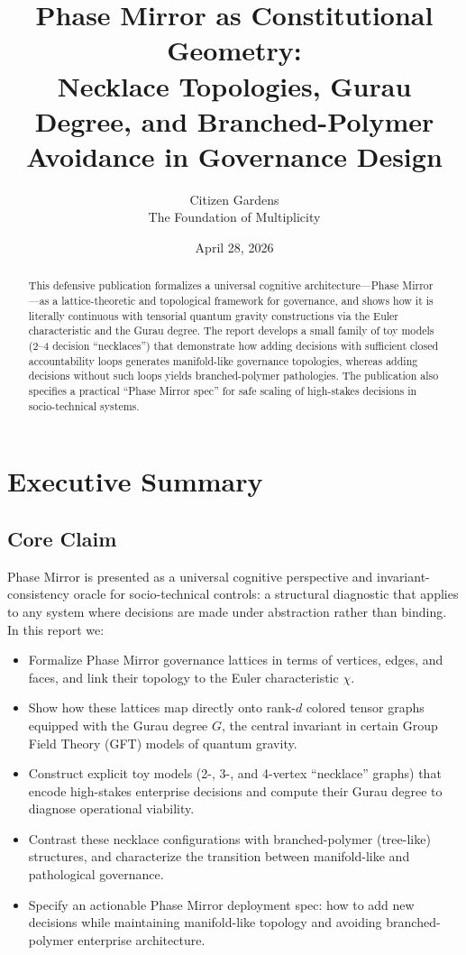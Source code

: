 \documentclass[11pt]{article}
\title{Phase Mirror as Constitutional Geometry:\\
Necklace Topologies, Gurau Degree, and Branched-Polymer Avoidance in Governance Design}
\author{Citizen Gardens \\ The Foundation of Multiplicity}
\date{April 28, 2026}
\begin{document}
\maketitle

\begin{abstract}
This defensive publication formalizes a universal cognitive architecture---Phase Mirror---as a lattice-theoretic and topological framework for governance, and shows how it is literally continuous with tensorial quantum gravity constructions via the Euler characteristic and the Gurau degree. The report develops a small family of toy models (2--4 decision ``necklaces'') that demonstrate how adding decisions with sufficient closed accountability loops generates manifold-like governance topologies, whereas adding decisions without such loops yields branched-polymer pathologies. The publication also specifies a practical ``Phase Mirror spec'' for safe scaling of high-stakes decisions in socio-technical systems.
\end{abstract}
\newpage
\tableofcontents

\section{Executive Summary}

\subsection{Core Claim}

Phase Mirror is presented as a universal cognitive perspective and invariant-consistency oracle for socio-technical controls: a structural diagnostic that applies to any system where decisions are made under abstraction rather than binding. In this report we:

\begin{itemize}
  \item Formalize Phase Mirror governance lattices in terms of vertices, edges, and faces, and link their topology to the Euler characteristic \(\chi\).
  \item Show how these lattices map directly onto rank-\(d\) colored tensor graphs equipped with the Gurau degree \(G\), the central invariant in certain Group Field Theory (GFT) models of quantum gravity.
  \item Construct explicit toy models (2-, 3-, and 4-vertex ``necklace'' graphs) that encode high-stakes enterprise decisions and compute their Gurau degree to diagnose operational viability.
  \item Contrast these necklace configurations with branched-polymer (tree-like) structures, and characterize the transition between manifold-like and pathological governance.
  \item Specify an actionable Phase Mirror deployment spec: how to add new decisions while maintaining manifold-like topology and avoiding branched-polymer enterprise architecture.
\end{itemize}
\end{document}
